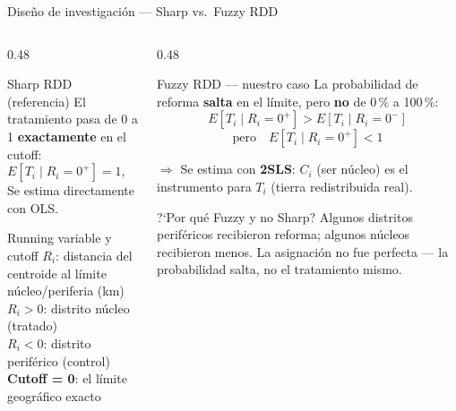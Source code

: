 \documentclass[aspectratio=169,t]{beamer}
\newcommand{\hl}[1]{\textcolor{azulmedio}{\textbf{#1}}}
\begin{document}
\begin{frame}{Dise\~no de investigaci\'on --- Sharp vs.\ Fuzzy RDD}
\vspace{-0.3cm}
\begin{columns}[T]

  \begin{column}{0.48\textwidth}
    \begin{block}{Sharp RDD (referencia)}
    \small
    El tratamiento pasa de 0 a 1
    \textbf{exactamente} en el cutoff:
    \[
      E[T_i \mid R_i = 0^{+}] = 1, \quad
      E[T_i \mid R_i = 0^{-}] = 0
    \]
    Se estima directamente con OLS.
    \end{block}
    \vspace{0.05cm}
    \begin{exampleblock}{Running variable y cutoff}
    \small
    \textbf{$R_i$}: distancia del centroide
    al l\'imite n\'ucleo/periferia (km)\\[0.08cm]
    $R_i > 0$: distrito n\'ucleo (tratado)\\
    $R_i < 0$: distrito perif\'erico (control)\\[0.08cm]
    \textbf{Cutoff = 0}: el l\'imite geogr\'afico exacto
    \end{exampleblock}
  \end{column}

  \begin{column}{0.48\textwidth}
    \begin{alertblock}{Fuzzy RDD --- nuestro caso}
    \small
    La probabilidad de reforma \textbf{salta}
    en el l\'imite, pero \textbf{no} de 0\,\% a 100\,\%:
    \[
      E[T_i \mid R_i = 0^{+}] > E[T_i \mid R_i = 0^{-}]
    \]
    \vspace{-0.3cm}
    \[
      \text{pero}\quad E[T_i \mid R_i = 0^{+}] < 1
    \]
    \vspace{-0.2cm}

    $\Rightarrow$ Se estima con \hl{2SLS}:
    $C_i$ (ser n\'ucleo) es el instrumento
    para $T_i$ (tierra redistribuida real).
    \end{alertblock}
    \vspace{0.05cm}
    \begin{block}{\small ?`Por qu\'e Fuzzy y no Sharp?}
    \small
    Algunos distritos perif\'ericos recibieron
    reforma; algunos n\'ucleos recibieron menos.
    La asignaci\'on no fue perfecta --- la
    probabilidad salta, no el tratamiento mismo.
    \end{block}
  \end{column}

\end{columns}
\end{frame}
\end{document}
